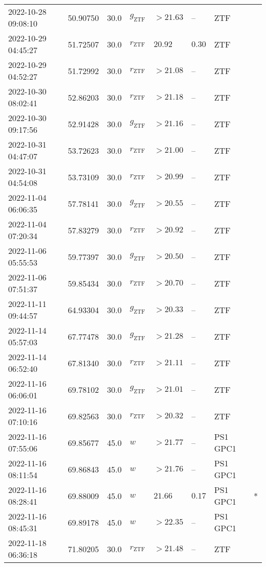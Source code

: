 \documentclass{nature_plusfigure}
\begin{document}
\begin{supplement}
\begin{center}
\begin{longtable}{llllllll}
2022-10-28 09:08:10 & 50.90750 & 30.0 & ${g}_\mathrm{ZTF}$ & $>21.63$ & -- & ZTF &  \\ 
2022-10-29 04:45:27 & 51.72507 & 30.0 & ${r}_\mathrm{ZTF}$ & $20.92$ & $0.30$ & ZTF &  \\ 
2022-10-29 04:52:27 & 51.72992 & 30.0 & ${r}_\mathrm{ZTF}$ & $>21.08$ & -- & ZTF &  \\ 
2022-10-30 08:02:41 & 52.86203 & 30.0 & ${r}_\mathrm{ZTF}$ & $>21.18$ & -- & ZTF &  \\ 
2022-10-30 09:17:56 & 52.91428 & 30.0 & ${g}_\mathrm{ZTF}$ & $>21.16$ & -- & ZTF &  \\ 
2022-10-31 04:47:07 & 53.72623 & 30.0 & ${r}_\mathrm{ZTF}$ & $>21.00$ & -- & ZTF &  \\ 
2022-10-31 04:54:08 & 53.73109 & 30.0 & ${r}_\mathrm{ZTF}$ & $>20.99$ & -- & ZTF &  \\ 
2022-11-04 06:06:35 & 57.78141 & 30.0 & ${g}_\mathrm{ZTF}$ & $>20.55$ & -- & ZTF &  \\ 
2022-11-04 07:20:34 & 57.83279 & 30.0 & ${r}_\mathrm{ZTF}$ & $>20.92$ & -- & ZTF &  \\ 
2022-11-06 05:55:53 & 59.77397 & 30.0 & ${g}_\mathrm{ZTF}$ & $>20.50$ & -- & ZTF &  \\ 
2022-11-06 07:51:37 & 59.85434 & 30.0 & ${r}_\mathrm{ZTF}$ & $>20.70$ & -- & ZTF &  \\ 
2022-11-11 09:44:57 & 64.93304 & 30.0 & ${g}_\mathrm{ZTF}$ & $>20.33$ & -- & ZTF &  \\ 
2022-11-14 05:57:03 & 67.77478 & 30.0 & ${g}_\mathrm{ZTF}$ & $>21.28$ & -- & ZTF &  \\ 
2022-11-14 06:52:40 & 67.81340 & 30.0 & ${r}_\mathrm{ZTF}$ & $>21.11$ & -- & ZTF &  \\ 
2022-11-16 06:06:01 & 69.78102 & 30.0 & ${g}_\mathrm{ZTF}$ & $>21.01$ & -- & ZTF &  \\ 
2022-11-16 07:10:16 & 69.82563 & 30.0 & ${r}_\mathrm{ZTF}$ & $>20.32$ & -- & ZTF &  \\ 
2022-11-16 07:55:06 & 69.85677 & 45.0 & $w$ & $>21.77$ & -- & PS1 GPC1 &  \\ 
2022-11-16 08:11:54 & 69.86843 & 45.0 & $w$ & $>21.76$ & -- & PS1 GPC1 &  \\ 
2022-11-16 08:28:41 & 69.88009 & 45.0 & $w$ & $21.66$ & $0.17$ & PS1 GPC1 & * \\ 
2022-11-16 08:45:31 & 69.89178 & 45.0 & $w$ & $>22.35$ & -- & PS1 GPC1 &  \\ 
2022-11-18 06:36:18 & 71.80205 & 30.0 & ${r}_\mathrm{ZTF}$ & $>21.48$ & -- & ZTF &  \\ 

\end{longtable}
\end{center}
\end{supplement}
\end{document}
